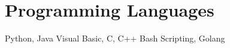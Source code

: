 \section{Programming Languages}\vspace{0.15cm}
Python, Java
Visual Basic, C, C++
Bash Scripting, Golang